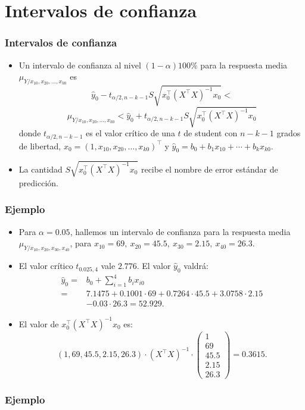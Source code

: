 \section{Intervalos de confianza}
\begin{frame}
\frametitle{Intervalos de confianza}
\begin{itemize}
\item<2->{Un intervalo de confianza al nivel $(1-\alpha) 100\%$ para la
respuesta media $\mu_{Y/x_{10},x_{20},\ldots,x_{k0}}$ es
$$\hat{y}_0 -t_{\alpha/2,n-k-1} S\sqrt{x^\top_0 (X^\top X)^{-1}
x_0}<$$
$$\mu_{Y/x_{10},x_{20},\ldots,x_{k0}} <\hat{y}_0
+t_{\alpha/2,n-k-1} S\sqrt{x^\top_0 (X^\top X)^{-1} x_0}$$
donde $t_{\alpha/2,n-k-1}$ es el valor crítico de una $t$ de
student con $n-k-1$ grados de libertad, 
$x_0=\left(1,
x_{10},x_{20},\ldots ,x_{k0}\right)^\top$ y $\hat{y}_0 = b_0 + b_1 x_{10} + \cdots +b_k x_{k0}.$}
\item<3->{La cantidad $S\sqrt{x^\top_0 (X^\top X)^{-1} x_0}$ recibe el nombre de
error estándar de predicción.
}
\end{itemize}
\end{frame}
\begin{frame}
\frametitle{Ejemplo}
\begin{itemize}
\item<2->{Para $\alpha =0.05$, hallemos un intervalo de confianza para la respuesta media $\mu_{Y/x_{10},x_{20},x_{30},x_{40}}$, para $x_{10} =69,\ x_{20} = 45.5,\ x_{30} = 2.15,\  x_{40} = 26.3$.}
\item<3->{El valor crítico $t_{0.025,4}$ vale $2.776$. El valor $\hat{y}_0$ valdrá:
$$
\begin{array}{rl}
\hat{y}_0 = & b_0 +\sum_{i=1}^4 b_i x_{i0} \\
= & 7.1475+0.1001\cdot 69 +0.7264\cdot 45.5+3.0758\cdot 2.15 \\ & -0.03\cdot 26.3 
=  52.929.
\end{array}
$$}
\item<4->{
El valor de $x^\top_0 (X^\top X)^{-1} x_0$ es:
$$
(1,69,45.5,2.15,26.3)\cdot (X^\top X)^{-1}\cdot \left(\begin{array}{l}
1\\ 69 \\ 45.5\\ 2.15 \\ 26.3\end{array}\right) = 0.3615.
$$}
\end{itemize}
\end{frame}
\begin{frame}
\frametitle{Ejemplo}
\end{frame}
